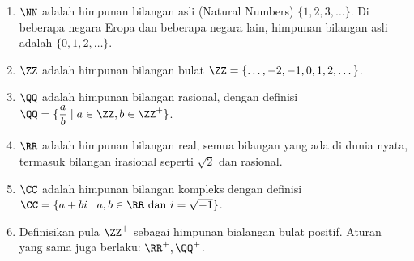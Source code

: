 \begin{enumerate}
\item $\NN$ adalah himpunan bilangan asli (Natural Numbers) $\{1,2,3,\dots\}$. Di beberapa negara Eropa dan beberapa negara lain, himpunan bilangan asli adalah $\{0,1,2,\dots\}$.
\item $\ZZ$ adalah himpunan bilangan bulat $\ZZ=\{\dots,-2,-1,0,1,2,\dots\}$.
\item $\QQ$ adalah himpunan bilangan rasional, dengan definisi $\QQ=\{\dfrac{a}{b}\mid a\in \ZZ, b\in\ZZ^+\}$.
\item $\RR$ adalah himpunan bilangan real, semua bilangan yang ada di dunia nyata, termasuk bilangan irasional seperti $\sqrt{2}$ dan rasional.
\item $\CC$ adalah himpunan bilangan kompleks dengan definisi\\ $\CC = \{a+bi \mid a,b \in \RR \text{ dan }i=\sqrt{-1}\}$.
\item Definisikan pula $\ZZ^+$ sebagai himpunan bialangan bulat positif. Aturan yang sama juga berlaku: $\RR^+, \QQ^+$.
\end{enumerate}